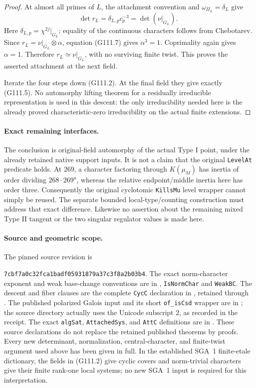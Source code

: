 \begin{proof}
At almost all primes of \(L\), the attachment convention
and \(\omega_{\Pi_L}=\delta_L\) give
\[
           \det r_L=\delta_{L,p}c_p^{-3}
                      =\det(\nu|_{G_L}).
 \tag{G111.7}
\]
Here \(\delta_{L,p}=\chi^{2j}|_{G_L}\); equality of the
continuous characters follows from Chebotarev. Since
\(r_L=\nu|_{G_L}\otimes\alpha\), equation (G111.7)
gives \(\alpha^3=1\). Coprimality again gives
\(\alpha=1\). Therefore \(r_L\simeq\nu|_{G_L}\),
with no surviving finite twist. This proves the asserted
attachment at the next field.

Iterate the four steps down (G111.2). At the final field
they give exactly (G111.5). No automorphy lifting theorem
for a residually irreducible representation is used in
this descent: the only irreducibility needed here is the
already proved characteristic-zero irreducibility on
the actual finite extensions.
\end{proof}

\paragraph{Exact remaining interfaces.}
The conclusion is original-field automorphy of the actual
Type I point, under the already retained native support
inputs. It is not a claim that the original
\texttt{LevelAt} predicate holds. At \(269\), a character
factoring through \(K(\mu_M)\) has inertia of order
dividing \(268\cdot269^a\), whereas the relative
endpoint/middle inertia here has order three.
Consequently the original cyclotomic \texttt{KillsMu}
level wrapper cannot simply be reused. The separate
bounded local-type/counting construction must address
that exact difference. Likewise no assertion about the
remaining mixed Type II tangent or the two singular
regulator values is made here.

\paragraph{Source and geometric scope.}
The pinned source revision is
\par\noindent\texttt{7cbf7a0c32fca1badf05931879a37c3f8a2b03b4}.
The exact norm-character exponent and weak base-change
conventions are in ,
\texttt{IsNormChar} and \texttt{WeakBC}. The descent and
fiber clauses are the complete \texttt{CycC} declaration
in , retained
through . The published polarized
Galois input and its short \texttt{of\_isCsd} wrapper are
in ;
the source directory actually uses the Unicode subscript
\(2\), as recorded in the receipt. The exact
\texttt{algSat}, \texttt{AttachedSys}, and \texttt{AttC}
definitions are in .
These source declarations do not replace the retained
published theorems by proofs. Every new determinant,
normalization, central-character, and finite-twist
argument used above has been given in full.
In the established SGA~1 finite-etale dictionary, the
fields in (G111.2) give cyclic covers and norm-trivial
characters give their finite rank-one local systems;
no new SGA~1 input is required for this interpretation.
